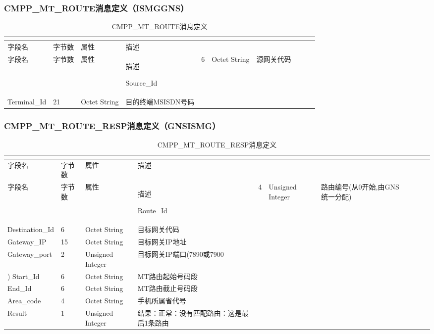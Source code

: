 \documentclass[11pt]{book} %
\begin{document}
\subsubsection{CMPP\_MT\_ROUTE消息定义（ISMG\textrightarrow GNS）}



\begin{longtable}{|m{90pt}|m{35pt}|m{80pt}|m{200pt}|}
\tabularnewline\hline
字段名&字节数&属性&描述
\endhead

\caption{CMPP\_MT\_ROUTE消息定义}\\
\hline
字段名&字节数&属性&描述
\endfirsthead

\endfoot

\endlastfoot

\hline
Source\_Id&6&Octet String&源网关代码\\
\hline
Terminal\_Id&21&Octet String&目的终端MSISDN号码\\
\hline
\end{longtable}




\subsubsection{CMPP\_MT\_ROUTE\_RESP消息定义（GNS\textrightarrow ISMG）}



\begin{longtable}{|m{90pt}|m{35pt}|m{80pt}|m{200pt}|}
\tabularnewline\hline
字段名&字节数&属性&描述
\endhead

\caption{CMPP\_MT\_ROUTE\_RESP消息定义}\\
\hline
字段名&字节数&属性&描述
\endfirsthead

\endfoot

\endlastfoot

\hline
Route\_Id&4&Unsigned Integer&路由编号(从0开始,由GNS统一分配)\\
\hline
Destination\_Id&6&Octet String&目标网关代码\\
\hline
Gateway\_IP&15&Octet String&目标网关IP地址\\
\hline
Gateway\_port&2&Unsigned Integer&目标网关IP端口(7890或7900\\
\hline)
Start\_Id&6&Octet String&MT路由起始号码段\\
\hline
End\_Id&6&Octet String&MT路由截止号码段\\
\hline
Area\_code&4&Octet String&手机所属省代号\\
\hline
Result&1&Unsigned Integer&结果：正常：没有匹配路由：这是最后1条路由\\
\hline
\end{longtable}
\end{document}
